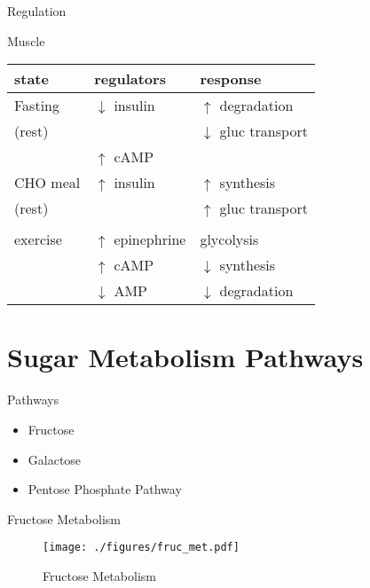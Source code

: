 \documentclass[presentation, smaller]{beamer}
\begin{document}
\begin{frame}[label={sec:orgfc2c354}]{Regulation}
\begin{block}{Muscle}
\begin{center}
\begin{tabular}{lll}
state & regulators & response\\
\hline
Fasting & \(\downarrow\) insulin & \(\uparrow\) degradation\\
(rest) &  & \(\downarrow\) gluc transport\\
 & \(\uparrow\) cAMP & \\
CHO meal & \(\uparrow\) insulin & \(\uparrow\) synthesis\\
(rest) &  & \(\uparrow\) gluc transport\\
 &  & \\
exercise & \(\uparrow\) epinephrine & glycolysis\\
 & \(\uparrow\) cAMP & \(\downarrow\) synthesis\\
 & \(\downarrow\) AMP & \(\downarrow\) degradation\\
\end{tabular}
\end{center}
\end{block}
\end{frame}

\section{Sugar Metabolism Pathways}
\label{sec:org95247d3}
\begin{frame}[label={sec:orge26ce06}]{Pathways}
\begin{itemize}
\item Fructose
\item Galactose
\item Pentose Phosphate Pathway
\end{itemize}
\end{frame}
\begin{frame}[label={sec:orgc0027f9}]{Fructose Metabolism}
\begin{figure}[htbp]
\centering
\texttt{[image: ./figures/fruc\_met.pdf]}
\caption{\label{fig:orgae1c94b}
Fructose Metabolism}
\end{figure}
\end{frame}
\end{document}
